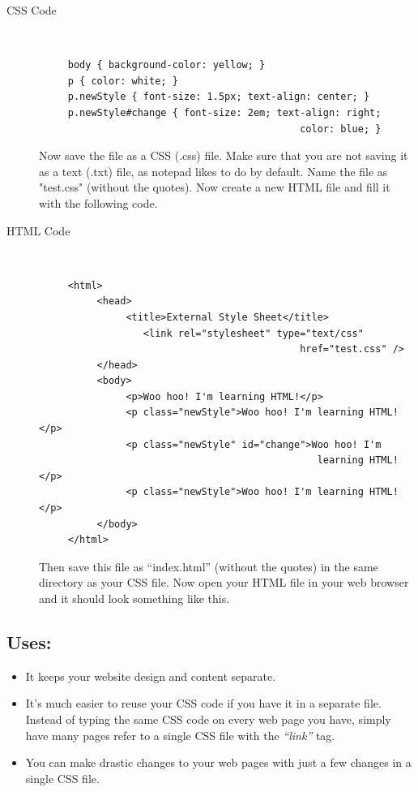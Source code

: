 \documentclass[11pt,a4paper]{article}
\begin{document}
\begin{description}
\item[CSS Code]\
\begin{verbatim}
     body { background-color: yellow; }
     p { color: white; }
     p.newStyle { font-size: 1.5px; text-align: center; }
     p.newStyle#change { font-size: 2em; text-align: right;
                                             color: blue; }
\end{verbatim}
Now save the file as a CSS (.css) file. Make sure that you are not saving it as a text (.txt) file, as notepad likes to do by default. Name the file as "test.css" (without the quotes). Now create a new HTML file and fill it with the following code.


\item[HTML Code]\
\begin{verbatim}
     <html>
          <head>
               <title>External Style Sheet</title>
                  <link rel="stylesheet" type="text/css" 
                                             href="test.css" />
          </head>
          <body>
               <p>Woo hoo! I'm learning HTML!</p>
               <p class="newStyle">Woo hoo! I'm learning HTML!</p>
               <p class="newStyle" id="change">Woo hoo! I'm
                                                learning HTML!</p>
               <p class="newStyle">Woo hoo! I'm learning HTML!</p>
          </body>
     </html>
\end{verbatim}
Then save this file as ``index.html'' (without the quotes) in the same directory as your CSS file. Now open your HTML file in your web browser and it should look something like this.
\end{description}

\subsection*{Uses:}
\begin{itemize}
\item It keeps your website design and content separate.
\item It's much easier to reuse your CSS code if you have it in a separate file. Instead of typing the same CSS code on every web page you have, simply have many pages refer to a single CSS file with the \emph{``link''} tag.
\item You can make drastic changes to your web pages with just a few changes in a single CSS file.
\end{itemize}
\end{document}
